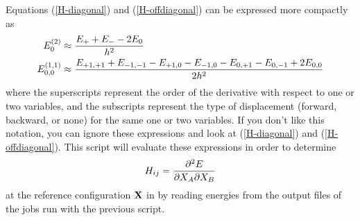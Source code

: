 \documentclass[11pt]{article}
\begin{document}
Equations (\ref{H-diagonal}) and (\ref{H-offdiagonal}) can be expressed more
compactly as
\begin{align}
    E_0\ord{2} \approx&\ 
    \fr{E_{+}+E_{-}-2E_0}{h^2} \\
    E_{0,0}\ord{1,1} \approx&\ 
    \fr{E_{+1,+1}+E_{-1,-1}-E_{+1,0}-E_{-1,0}-E_{0,+1}-E_{0,-1}+2E_{0,0}}{2h^2}
\end{align}
where the superscripts represent the order of the derivative with respect to
one or two variables, and the subscripts represent the type of displacement
(forward, backward, or none) for the same one or two variables. If you don't
like this notation, you can ignore these expressions and look at
(\ref{H-diagonal}) and (\ref{H-offdiagonal}). This script will evaluate these
expressions in order to determine
\begin{align*}
    H_{ij} = \dfrac{\partial^2E}{\partial X_A\partial X_B}
\end{align*}
at the reference configuration $\mathbf{X}$ in  by reading
energies from the output files of the jobs run with the previous script.
\end{document}
